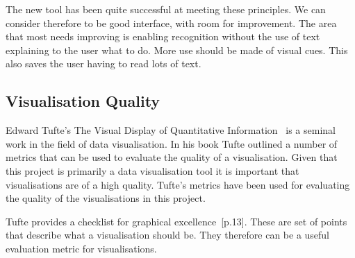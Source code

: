 The new tool has been quite successful at meeting these principles.  We can consider therefore to be good interface, with room for improvement.  The area that most needs improving is enabling recognition without the use of text explaining to the user what to do.  More use should be made of visual cues.  This also saves the user having to read lots of text.

\subsection{Visualisation Quality}

Edward Tufte's The Visual Display of Quantitative Information~\cite{tufte} is a seminal work in the field of data visualisation.  In his book Tufte outlined a number of metrics that can be used to evaluate the quality of a visualisation.  Given that this project is primarily a data visualisation tool it is important that visualisations are of a high quality.  Tufte's metrics have been used for evaluating the quality of the visualisations in this project.

Tufte provides a checklist for graphical excellence~\cite{tufte}[p.13].  These are set of points that describe what a visualisation should be.  They therefore can be a useful evaluation metric for visualisations.

